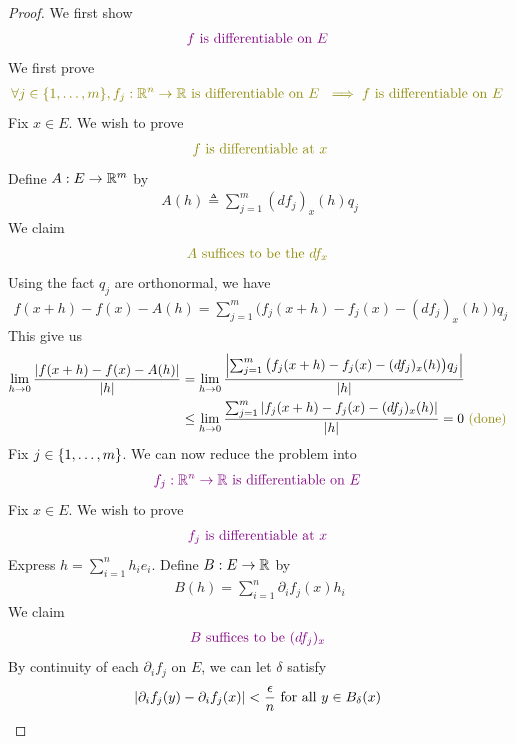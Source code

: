 \documentclass{report}
\begin{document}
\begin{proof}
We first show 
\begin{align*}
\textcolor{violet}{f\text{ is differentiable on $E$ }}
\end{align*}
We first prove 
\begin{align*}
\olive{\forall j\in \set{1,\dots, m}, f_j:\R^n\rightarrow \R\text{ is differentiable on $E$ }\implies f\text{ is differentiable on $E$ }}
\end{align*}
Fix $x\in E$. We wish to prove 
\begin{align*}
\olive{\text{ $f$ is differentiable at $x$ }}
\end{align*}
Define $A:E\rightarrow \mathbb{R}^m$ by 
\begin{align*}
A(h)\triangleq \sum_{j=1}^m  (df_j)_x (h)q_j
\end{align*}
We claim 
\begin{align*}
\olive{A\text{ suffices to be the $df_x$ }}
\end{align*}
Using the fact $q_j$ are orthonormal, we have
\begin{align*}
f(x+h)-f(x)-A(h)=\sum_{j=1}^m \big(f_j(x+h)-f_j(x)-(df_j)_x(h)  \big)q_j
\end{align*}
This give us 
\begin{align*}
\lim_{h\to 0} \frac{\abso{f(x+h)-f(x)-A(h)}}{\abso{h}}&=\lim_{h\to 0} \frac{\abso{\sum_{j=1}^m \big(f_j(x+h)-f_j(x)-(df_j)_x (h) \big)q_j}}{\abso{h}}\\
&\leq \lim_{h\to 0} \frac{\sum_{j=1}^m \abso{f_j(x+h)-f_j(x)-(df_j)_x(h)}}{\abso{h}}=0 \odone
\end{align*}
Fix $j \in \{ 1,\dots ,m \}$. We can now reduce the problem into 
\begin{align*}
  \textcolor{violet}{f_j:\mathbb{R}^n\rightarrow \mathbb{R}\text{ is differentiable on $E$ }}
\end{align*}
Fix $x \in E$. We wish to prove 
\begin{align*}
\textcolor{violet}{f_j\text{ is differentiable at $x$ }}
\end{align*}
Express $h=\sum_{i=1}^n h_ie_i$. Define $B:E\rightarrow \mathbb{R}$ by
\begin{align*}
B(h)=\sum_{i=1}^n \partial_i f_j(x)h_i
\end{align*}
We claim 
\begin{align*}
\textcolor{violet}{B\text{ suffices to be $(df_j)_x$ }}
\end{align*}
By continuity of each $\partial_i f_j$ on $E$, we can let  $\delta$ satisfy 
\begin{align*}
\abso{\partial_i f_j(y)-\partial_i f_j(x)}<  \frac{\epsilon }{n}  \text{ for all $y\in B_\delta(x)$  }

\end{align*}
\end{proof}
\end{document}

